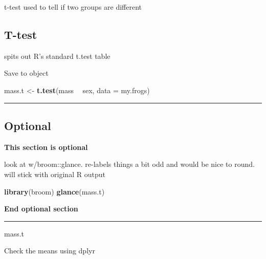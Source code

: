 \documentclass[]{book}
\newenvironment{Shaded}{\begin{snugshade}}{\end{snugshade}}
\newcommand{\KeywordTok}[1]{\textcolor[rgb]{0.13,0.29,0.53}{\textbf{#1}}}
\newcommand{\DataTypeTok}[1]{\textcolor[rgb]{0.13,0.29,0.53}{#1}}
\newcommand{\StringTok}[1]{\textcolor[rgb]{0.31,0.60,0.02}{#1}}
\newcommand{\OperatorTok}[1]{\textcolor[rgb]{0.81,0.36,0.00}{\textbf{#1}}}
\newcommand{\NormalTok}[1]{#1}
\theoremstyle{definition}
\theoremstyle{definition}
\theoremstyle{definition}
\theoremstyle{remark}
\begin{document}
t-test used to tell if two groups are different

\subsection{T-test}\label{t-test}

spits out R's standard t.test table

Save to object

\begin{Shaded}
\begin{Highlighting}[]
\NormalTok{mass.t <-}\StringTok{  }\KeywordTok{t.test}\NormalTok{(mass }\OperatorTok{~}\StringTok{ }\NormalTok{sex, }\DataTypeTok{data =}\NormalTok{ my.frogs)}
\end{Highlighting}
\end{Shaded}

\begin{center}\rule{0.5\linewidth}{\linethickness}\end{center}

\subsection{Optional}\label{optional-1}

\textbf{This section is optional}

look at w/broom::glance. re-labels things a bit odd and would be nice to
round. will stick with original R output

\begin{Shaded}
\begin{Highlighting}[]
\KeywordTok{library}\NormalTok{(broom)}
\KeywordTok{glance}\NormalTok{(mass.t)}
\end{Highlighting}
\end{Shaded}

\textbf{End optional section}

\begin{center}\rule{0.5\linewidth}{\linethickness}\end{center}

\begin{Shaded}
\begin{Highlighting}[]
\NormalTok{mass.t}
\end{Highlighting}
\end{Shaded}

Check the means using dplyr

\begin{Shaded}
\end{Shaded}
\end{document}
